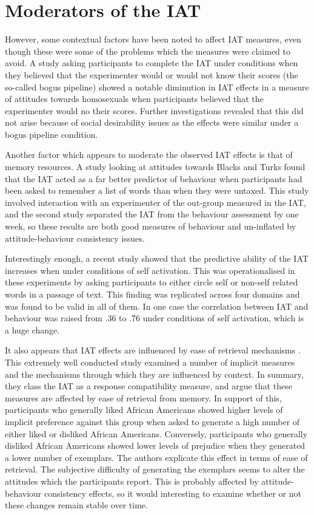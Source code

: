 \section{Moderators of the IAT}


However, some contextual factors have been noted to affect IAT measures, even though these were some of the problems which the measures were claimed to avoid. A study asking participants to complete the IAT under conditions when they believed that the experimenter would or would not know their scores (the so-called bogus pipeline) \cite{Boysen2006} showed a notable diminution in IAT effects in a measure of attitudes towards homosexuals when participants believed that the experimenter would no their scores. Further investigations revealed that this did not arise because of social desirability issues as the effects were similar under a bogus pipeline condition. 

Another factor which appears to moderate the observed IAT effects is that of memory resources. A study looking at attitudes towards Blacks and Turks \cite{Hofmann2008a} found that the IAT acted as a far better predictor of behaviour when participants had been asked to remember a list of words than when they were untaxed. This study involved interaction with an experimenter of the out-group measured in the IAT, and the second study separated the IAT from the behaviour assessment by one week, so these results are both good measures of behaviour and un-inflated by attitude-behaviour consistency issues. 

Interestingly enough, a recent study \cite{Perugini2007} showed that the predictive ability of the IAT increases when under conditions of self activation. This was operationalised in these experiments by asking participants to either circle self or non-self related words in a passage of text. This finding was replicated across four domains and was found to be valid in all of them. In one case the correlation between IAT and behaviour was raised from .36 to .76 under conditions of self activation, which is a huge change. 


It also appears that IAT effects are influenced by ease of retrieval mechanisms \cite{Gawronski2005}. This extremely well conducted study examined a number of implicit measures and the mechanisms through which they are influenced by context. In summary, they class the IAT as a response compatibility measure, and argue that these measures are affected by ease of retrieval from memory. In support of this, participants who generally liked African Americans showed higher levels of implicit preference against this group when asked to generate a high number of either liked or disliked African Americans. Conversely, participants who generally disliked African Americans showed lower levels of prejudice when they generated a lower number of exemplars. The authors explicate this effect in terms of ease of retrieval. The subjective difficulty of generating the exemplars seems to alter the attitudes which the participants report. This is probably affected by attitude-behaviour consistency effects, so it would interesting to examine whether or not these changes remain stable over time.  


